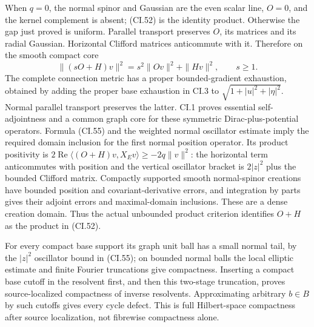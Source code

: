\documentclass[
  11pt,
]{article}
\begin{document}
When \(q=0\), the normal spinor and Gaussian are the even scalar line,
\(O=0\), and the kernel complement is absent; (CI.52) is the identity
product. Otherwise the gap just proved is uniform. Parallel transport
preserves \(O\), its matrices and its radial Gaussian. Horizontal
Clifford matrices anticommute with it. Therefore on the smooth compact
core \[
 \| (sO+H)v\|^2=s^2\|Ov\|^2+\|Hv\|^2,
                   \qquad s\geq1.
 \tag{CI.55}
\] The complete connection metric has a proper bounded-gradient
exhaustion, obtained by adding the proper base exhaustion in CI.3 to
\(\sqrt{1+|u|^2+|\eta|^2}\). Normal parallel transport preserves the
latter. CI.1 proves essential self-adjointness and a common graph core
for these symmetric Dirac-plus-potential operators. Formula (CI.55) and
the weighted normal oscillator estimate imply the required domain
inclusion for the first normal position operator. Its product positivity
is \(2\operatorname{Re}\langle(O+H)v,X_Ev\rangle\geq-2q\|v\|^2\): the
horizontal term anticommutes with position and the vertical oscillator
bracket is \(2|z|^2\) plus the bounded Clifford matrix. Compactly
supported smooth normal-spinor creations have bounded position and
covariant-derivative errors, and integration by parts gives their
adjoint errors and maximal-domain inclusions. These are a dense creation
domain. Thus the actual unbounded product criterion identifies \(O+H\)
as the product in (CI.52).

For every compact base support its graph unit ball has a small normal
tail, by the \(|z|^2\) oscillator bound in (CI.55); on bounded normal
balls the local elliptic estimate and finite Fourier truncations give
compactness. Inserting a compact base cutoff in the resolvent first, and
then this two-stage truncation, proves source-localized compactness of
inverse resolvents. Approximating arbitrary \(b\in B\) by such cutoffs
gives every cycle defect. This is full Hilbert-space compactness after
source localization, not fibrewise compactness alone.
\end{document}
